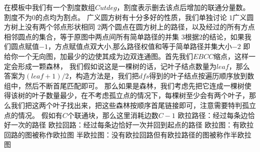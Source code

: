 {}\markdownRendererSectionBegin
{}\markdownRendererInterblockSeparator
{}在模板中我们有一个割度数组$ Cutdeg $，割度表示删去该点后增加的联通分量数。割度不为$ 0 $的点均为割点。\markdownRendererInterblockSeparator
{}\markdownRendererInterblockSeparator
{}广义圆方树有十分多好的性质，我们单独讨论\markdownRendererParagraphSeparator
{}$ 1 $广义圆方树上没有两个邻点形状相同\markdownRendererParagraphSeparator
{}$ 2 $两个圆点在圆方树上的路径，以及经过的所有方点相邻圆点的集合，等于原图中两点间所有简单路径的并集\markdownRendererParagraphSeparator
{}$ 3 $根据$ 2 $的结论，如果我们圆点赋值$ -1 $，方点赋值点双大小,那么路径权值和等于简单路径并集大小$ -2 $\markdownRendererInterblockSeparator
{}
\markdownRendererSectionEnd \markdownRendererSectionBegin
{}\markdownRendererInterblockSeparator
{}\markdownRendererInterblockSeparator
{}
\markdownRendererSectionEnd \markdownRendererSectionBegin
{}\markdownRendererInterblockSeparator
{}\markdownRendererInterblockSeparator
{}
\markdownRendererSectionEnd \markdownRendererSectionBegin
{}\markdownRendererInterblockSeparator
{}即给你一个无向图，加最少的边使其成为边双连通图。首先我们$ EBCC $缩点，这样一定会形成一颗森林，\markdownRendererParagraphSeparator
{}我们假如说这是一棵树的话，记叶子结点数量为$ leaf $，那么答案为$ (leaf+1)/2 $，构造方法是，我们把$ dfs $得到的叶子结点按遍历顺序放到数组中，然后不断首尾匹配即可。\markdownRendererParagraphSeparator
{}那么如果是森林，我们考虑先把它连成一棵树使得该树的叶子数量最少，在不考虑孤立点的情况下，每棵树至少会有两个叶子，那么我们把这两个叶子找出来，把这些森林按顺序首尾链接即可，注意需要特判孤立点的情况。\markdownRendererParagraphSeparator
{}假如有$ C $个联通块，那么这里消耗边数$ C-1 $\markdownRendererInterblockSeparator
{}
\markdownRendererSectionEnd 
\markdownRendererSectionEnd 
\markdownRendererSectionEnd \markdownRendererSectionBegin
{}\markdownRendererInterblockSeparator
{}欧拉路径：经过每条边恰好一次的路径\markdownRendererParagraphSeparator
{}欧拉回路：经过每条边恰好一次并回到起点的路径\markdownRendererParagraphSeparator
{}欧拉图：有欧拉回路的图被称作欧拉图\markdownRendererParagraphSeparator
{}半欧拉图：没有欧拉回路但有欧拉路径的图被称作半欧拉图\markdownRendererParagraphSeparator
